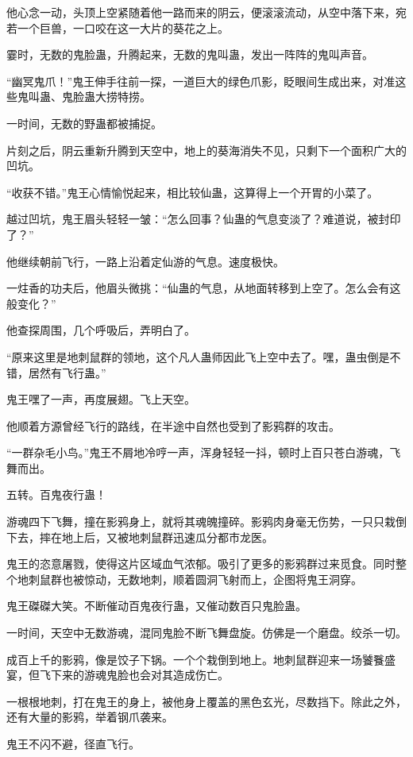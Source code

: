\begin{this_body}
他心念一动，头顶上空紧随着他一路而来的阴云，便滚滚流动，从空中落下来，宛若一个巨兽，一口咬在这一大片的葵花之上。

霎时，无数的鬼脸蛊，升腾起来，无数的鬼叫蛊，发出一阵阵的鬼叫声音。

“幽冥鬼爪！”鬼王伸手往前一探，一道巨大的绿色爪影，眨眼间生成出来，对准这些鬼叫蛊、鬼脸蛊大捞特捞。

一时间，无数的野蛊都被捕捉。

片刻之后，阴云重新升腾到天空中，地上的葵海消失不见，只剩下一个面积广大的凹坑。

“收获不错。”鬼王心情愉悦起来，相比较仙蛊，这算得上一个开胃的小菜了。

越过凹坑，鬼王眉头轻轻一皱：“怎么回事？仙蛊的气息变淡了？难道说，被封印了？”

他继续朝前飞行，一路上沿着定仙游的气息。速度极快。

一炷香的功夫后，他眉头微挑：“仙蛊的气息，从地面转移到上空了。怎么会有这般变化？”

他查探周围，几个呼吸后，弄明白了。

“原来这里是地刺鼠群的领地，这个凡人蛊师因此飞上空中去了。嘿，蛊虫倒是不错，居然有飞行蛊。”

鬼王嘿了一声，再度展翅。飞上天空。

他顺着方源曾经飞行的路线，在半途中自然也受到了影鸦群的攻击。

“一群杂毛小鸟。”鬼王不屑地冷哼一声，浑身轻轻一抖，顿时上百只苍白游魂，飞舞而出。

五转。百鬼夜行蛊！

游魂四下飞舞，撞在影鸦身上，就将其魂魄撞碎。影鸦肉身毫无伤势，一只只栽倒下去，摔在地上后，又被地刺鼠群迅速瓜分都市龙医。

鬼王的恣意屠戮，使得这片区域血气浓郁。吸引了更多的影鸦群过来觅食。同时整个地刺鼠群也被惊动，无数地刺，顺着圆洞飞射而上，企图将鬼王洞穿。

鬼王磔磔大笑。不断催动百鬼夜行蛊，又催动数百只鬼脸蛊。

一时间，天空中无数游魂，混同鬼脸不断飞舞盘旋。仿佛是一个磨盘。绞杀一切。

成百上千的影鸦，像是饺子下锅。一个个栽倒到地上。地刺鼠群迎来一场饕餮盛宴，但飞下来的游魂鬼脸也会对其造成伤亡。

一根根地刺，打在鬼王的身上，被他身上覆盖的黑色玄光，尽数挡下。除此之外，还有大量的影鸦，举着钢爪袭来。

鬼王不闪不避，径直飞行。


\end{this_body}
